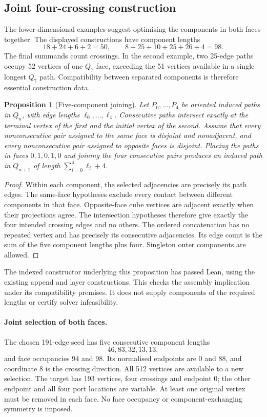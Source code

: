 \documentclass[11pt,a4paper]{article}
\newtheorem{proposition}[theorem]{Proposition}
\theoremstyle{definition}
\theoremstyle{remark}
\begin{document}
\subsection{Joint four-crossing construction}
\label{sec:coupled223}
The lower-dimensional examples suggest optimising the components in both
faces together. The displayed constructions have component lengths
\[
18+24+6+2=50,\qquad 8+25+10+25+26+4=98.
\]
The final summands count crossings. In the second example, two 25-edge
paths occupy 52 vertices of one $Q_7$ face, exceeding the 51 vertices
available in a single longest $Q_7$ path. Compatibility between separated
components is therefore essential construction data.

\begin{proposition}[Five-component joining]\label{prop:five-join223}
Let $P_0,\ldots,P_4$ be oriented induced paths in $Q_n$, with edge
lengths $\ell_0,\ldots,\ell_4$. Consecutive paths intersect exactly at
the terminal vertex of the first and the initial vertex of the second.
Assume that every nonconsecutive pair assigned to the same face is
disjoint and nonadjacent, and every nonconsecutive pair assigned to
opposite faces is disjoint. Placing the paths in faces $0,1,0,1,0$
and joining the four consecutive pairs produces an induced path in
$Q_{n+1}$ of length $\sum_{i=0}^{4}\ell_i+4$.
\end{proposition}
\begin{proof}
Within each component, the selected adjacencies are precisely its path
edges. The same-face hypotheses exclude every contact between different
components in that face. Opposite-face cube vertices are adjacent exactly
when their projections agree. The intersection hypotheses therefore give
exactly the four intended crossing edges and no others. The ordered
concatenation has no repeated vertex and has precisely its consecutive
adjacencies. Its edge count is the sum of the five component lengths
plus four. Singleton outer components are allowed.
\end{proof}
The indexed constructor underlying this proposition has passed Lean,
using the existing append and layer constructions. This checks the
assembly implication under its compatibility premises. It does not
supply components of the required lengths or certify solver infeasibility.

\paragraph{Joint selection of both faces.}
The chosen 191-edge seed has five consecutive component lengths
\[
46,83,32,13,13,
\]
and face occupancies 94 and 98. Its normalised endpoints are 0 and 88,
and coordinate 8 is the crossing direction. All 512 vertices are
available to a new selection. The target has 193 vertices, four
crossings and endpoint 0; the other endpoint and all four port locations
are variable. At least one original vertex must be removed in each face.
No face occupancy or component-exchanging symmetry is imposed.
\end{document}
